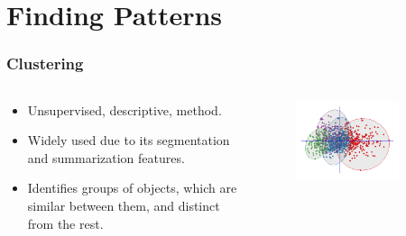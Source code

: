 \documentclass[hyperref={pdfpagelabels=true}]{beamer}
\begin{document}
\section{Finding Patterns} 
\begin{frame}
\frametitle{Clustering}
\begin{columns}
  \begin{column}{0.5\textwidth}\small{ 
    \begin{itemize}
      \item<1->Unsupervised, descriptive, method.    
      \item<2->Widely used due to its segmentation and summarization features.
      \item<3->Identifies groups of objects, which are similar between them, and distinct from the rest.
      \end{itemize}  }
  \end{column}
  \begin{column}{0.5\textwidth}
      \begin{figure}  
	\includegraphics[width=0.8\textwidth]{Cluster_analysis.png}
       \end{figure}  
  \end{column}  
\end{columns}
\end{frame}
\end{document}

